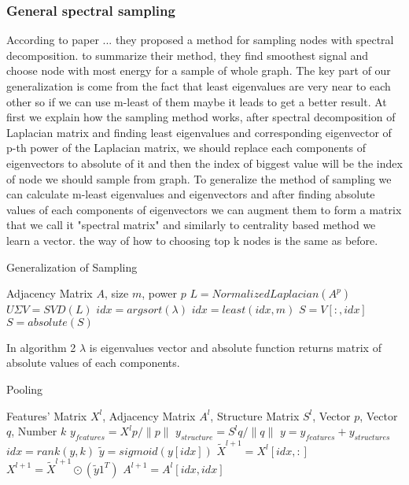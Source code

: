 \documentclass[nohyperref]{article}
\theoremstyle{plain}
\theoremstyle{definition}
\theoremstyle{remark}
\begin{document}
\subsubsection{General spectral sampling}
According to paper ... they proposed a method for sampling nodes with spectral decomposition. to summarize their method, they find smoothest signal and choose node with most energy for a sample of whole graph. The key part of our generalization is come from the fact that least eigenvalues are very near to each other so if we can use m-least of them maybe it leads to get a better result. At first we explain how the sampling method works, after spectral decomposition of Laplacian matrix and finding least eigenvalues and corresponding eigenvector of p-th power of the Laplacian matrix, we should replace each components of eigenvectors to absolute of it and then the index of biggest value will be the index of node we should sample from graph. To generalize the method of sampling we can calculate m-least eigenvalues and eigenvectors and after finding absolute values of each components of eigenvectors we can augment them to form a matrix that we call it "spectral matrix" and similarly to centrality based method we learn a vector. the way of how to choosing top k nodes is the same as before.
\begin{algorithm}[tb]
	\caption{Generalization of Sampling }
	\label{alg:example}
	\begin{algorithmic}
		 Adjacency Matrix $A$, size $m$, power $p$
		\STATE $L=NormalizedLaplacian(A^p)$
		\STATE $U\Sigma V = SVD(L)$
		\STATE $idx = argsort(\lambda)$
		\STATE $idx = least(idx, m)$
		\STATE $S=V[:,idx]$
		\STATE $S=absolute(S)$
	\end{algorithmic}
\end{algorithm}
In algorithm 2 $\lambda$ is eigenvalues vector and absolute function returns matrix of absolute values of each components.
\begin{algorithm}[tb]
	\caption{Pooling }
	\label{alg:example}
	\begin{algorithmic}
		 Features' Matrix $X^l$, Adjacency Matrix $A^l$, Structure Matrix $S^l$, Vector $p$, Vector $q$, Number $k$
		\STATE $y_{features} = X^lp/ \| p \|$
		\STATE $y_{structure} = S^lq/ \| q \|$
		\STATE $y = y_{features} + y_{structures}$
		\STATE $idx=rank(y,k)$
		\STATE $\tilde{y} = sigmoid(y[idx])$
		\STATE $\tilde{X}^{l+1}=X^l[idx, :]$
		\STATE $X^{l+1}=\tilde{X}^{l+1} \odot (\tilde{y}1^T)$
		\STATE $A^{l+1}=A^l[idx,idx]$
	\end{algorithmic}
\end{algorithm}
\end{document}
